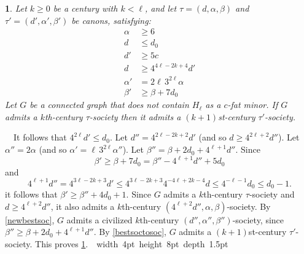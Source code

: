 \documentclass[titlepage,11pt]{article}
\newcommand\blackslug{\hbox{\hskip 1pt \vrule width 4pt height 8pt depth 1.5pt
		\hskip 1pt}}
\newcommand\bbox{\hfill \quad \blackslug \bigbreak}
\newtheorem{thm}{}[section]
\newcommand{\Proof}{\noindent{\bf Proof.}\ \ }
\begin{document}
	\begin{thm}\label{soctosoc}
		Let $k\ge 0$ be a century with $k<\ell$, and let $\tau=(d,\alpha,\beta)$ and $\tau'=(d', \alpha', \beta')$ be canons,
		satisfying:
		\begin{align*}
			\alpha&\ge 6\\
			d&\le d_0\\
			d'&\ge 5c\\
			d &\ge 4^{4\ell -2k+4} d'\\
			\alpha'&=2\ell\,3^{2\ell}\alpha\\
			\beta' &\ge  \beta+7d_0
		\end{align*}
		Let $G$ be a connected graph that does not contain $H_\ell$ as a $c$-fat minor. If $G$ admits a $k$th-century $\tau$-society
		then it admits a $(k+1)$st-century $\tau'$-society.
	\end{thm}
	\Proof It follows that $4^{2\ell}d'\le d_0$. Let $d''= 4^{2\ell -2k+2} d'$ (and so $d\ge 4^{2\ell+2} d''$). Let $\alpha''=2\alpha$ (and so $\alpha'=\ell\,3^{2\ell}\alpha''$).
	Let $\beta'' = \beta +2d_0+4^{\ell+1} d''$. Since
	$$\beta'\ge \beta+7d_0= \beta'' -4^{\ell+1} d''+5d_0$$
	and 
	$$4^{\ell+1} d''=4^{3\ell -2k+3} d'\le 4^{3\ell -2k+3} 4^{-4\ell +2k-4}d\le  4^{-\ell -1}d_0\le d_0-1.$$
	it follows that $\beta' \ge  \beta''+4d_0+1$.
	Since $G$ admits a $k$th-century $\tau$-society and $d\ge 4^{\ell+2}d''$, 
	it also admits a $k$th-century $(4^{\ell+2}d'',\alpha,\beta)$-society. 
	By \ref{newbestsoc}, $G$ admits a civilized $k$th-century $(d'', \alpha'', \beta'')$-society, since $\beta''\ge \beta+2d_0+4^{\ell+1} d''$. 
	By \ref{bestsoctosoc},
	$G$ admits a $(k+1)$st-century $\tau'$-society. This proves \ref{soctosoc}.~\bbox
	
\end{document}
